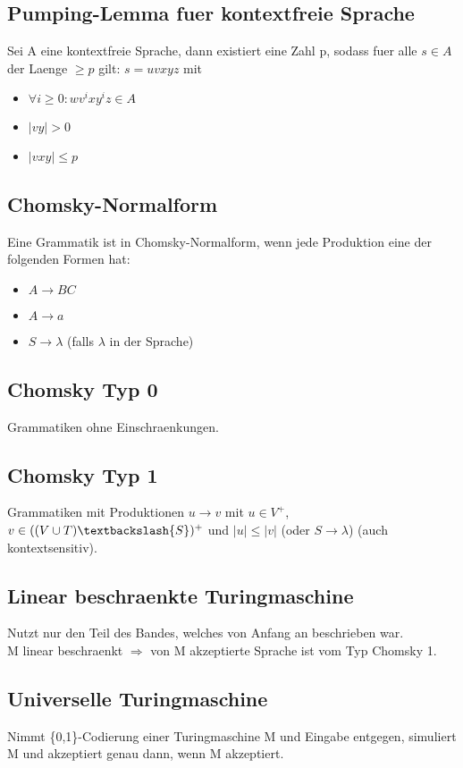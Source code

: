 \documentclass[a4paper]{scrreprt}
\begin{document}
\subsection{Pumping-Lemma fuer kontextfreie Sprache}
Sei A eine kontextfreie Sprache, dann existiert eine Zahl p, sodass fuer alle $s \in A$ der Laenge $\ge p$ gilt: $s = uvxyz$ mit
\begin{itemize}
	\item $\forall i \ge 0: wv^ixy^iz \in A$
	\item $|vy| > 0$
	\item $|vxy| \le p$
\end{itemize}

\subsection{Chomsky-Normalform}
Eine Grammatik ist in Chomsky-Normalform, wenn jede Produktion eine der folgenden Formen hat:
\begin{itemize}
	\item $A \rightarrow BC$
	\item $A \rightarrow a$
	\item $S \rightarrow \lambda$ (falls $\lambda$ in der Sprache)
\end{itemize}

\subsection{Chomsky Typ 0}
Grammatiken ohne Einschraenkungen.

\subsection{Chomsky Typ 1}
Grammatiken mit Produktionen $u \rightarrow v$ mit $u \in V^+$, $v \in ((V \cup T) \textbackslash \{S\})^+$ und $|u| \le |v|$ (oder $S \rightarrow \lambda$) (auch kontextsensitiv).

\subsection{Linear beschraenkte Turingmaschine}
Nutzt nur den Teil des Bandes, welches von Anfang an beschrieben war.\\
M linear beschraenkt $\Rightarrow$ von M akzeptierte Sprache ist vom Typ Chomsky 1.

\subsection{Universelle Turingmaschine}
Nimmt \{0,1\}-Codierung einer Turingmaschine M und Eingabe entgegen, simuliert M und akzeptiert genau dann, wenn M akzeptiert.
\end{document}
